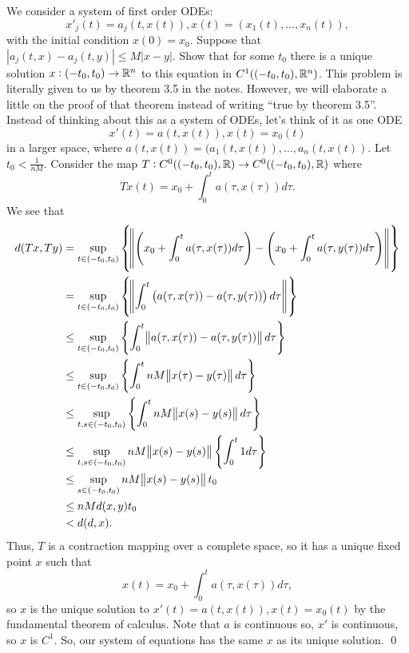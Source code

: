 \documentclass{article}
\begin{document}
\newpage
{} We consider a system of first order ODEs:
\[x'_j(t) = a_j(t, x(t)), x(t) = (x_1(t), \dots, x_n(t)),\]
with the initial condition $x(0) = x_0$. Suppose that $|a_j(t, x) - a_j(t, y)| \le M |x -y|$. Show that
for some $t_0$ there is a unique solution $x : (-t_0, t_0) \to \mathbb{R}^n$ to this equation in $C^1((-t_0, t_0), \mathbb{R}^n)$. \tri
\hop
\solution
This problem is literally given to us by theorem 3.5 in the notes. However, we will elaborate a little on the proof of that theorem instead of writing ``true by theorem 3.5''. 
\hop 
Instead of thinking about this as a system of ODEs, let's think of it as one ODE 
\[x'(t) = a(t,x(t)), x(t) = x_0(t)\]
in a larger space, where $a(t,x(t)) = (a_1(t,x(t)), \dots, a_n(t,x(t))$. Let $t_0 < \frac{1}{nM}$. Consider the map $T: C^0((-t_0, t_0), \mathbb{R}) \to  C^0((-t_0, t_0), \mathbb{R})$ where
\[Tx(t) = x_0 + \int_0^ta(\tau,x(\tau))d\tau.\]
We see that 
\begin{align*}
    d(Tx,Ty) &= \sup_{t \in (-t_0,t_0)}\cbr{\norm{\del{x_0 + \int_0^ta(\tau,x(\tau))d\tau}-\del{x_0 + \int_0^ta(\tau,y(\tau))d\tau}}}\\
    &= \sup_{t \in (-t_0,t_0)}\cbr{\norm{\int_0^t\del{a(\tau,x(\tau))-a(\tau,y(\tau))}d\tau}}\\
    &\le \sup_{t \in (-t_0,t_0)}\cbr{\int_0^t\norm{a(\tau,x(\tau))-a(\tau,y(\tau))}d\tau}\\
    & \le  \sup_{t \in (-t_0,t_0)}\cbr{\int_0^tnM\norm{x(\tau)-y(\tau)}d\tau} \\
    & \le  \sup_{t, s \in (-t_0,t_0)}\cbr{\int_0^tnM\norm{x(s)-y(s)}d\tau} \\
    & \le  \sup_{t, s \in (-t_0,t_0)}nM\norm{x(s)-y(s)}\cbr{\int_0^t1d\tau} \\
    & \le  \sup_{s \in (-t_0,t_0)}nM\norm{x(s)-y(s)}t_0\\
    & \le nMd(x,y)t_0\\
    & < d(d,x).
\end{align*}
Thus, $T$ is a contraction mapping over a complete space, so it has a unique fixed point $x$ such that 
\[x(t) = x_0 + \int_0^ta(\tau,x(\tau))d\tau,\]
so $x$ is the unique solution to $x'(t) = a(t,x(t)), x(t) = x_0(t)$ by the fundamental theorem of calculus. Note that $a$ is continuous so, $x'$ is continuous, so $x$ is $C^1$. So, our system of equations has the same $x$ as its unique solution. 
\qed
\end{document}
